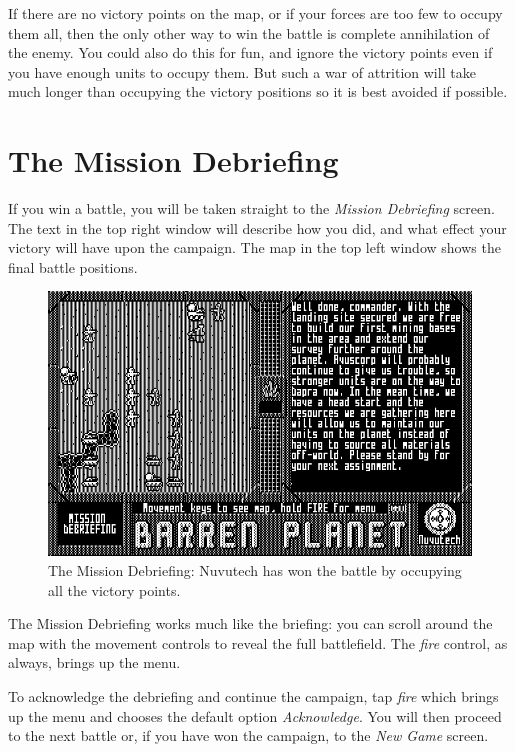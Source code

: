 If there are no victory points on the map, or if your forces are too few to occupy them all, then the only other way to win the battle is complete annihilation of the enemy. You could also do this for fun, and ignore the victory points even if you have enough units to occupy them. But such a war of attrition will take much longer than occupying the victory positions so it is best avoided if possible.

\section{The Mission Debriefing}

\noindent
If you win a battle, you will be taken straight to the {\it Mission Debriefing} screen. The text in the top right window will describe how you did, and what effect your victory will have upon the campaign. The map in the top left window shows the final battle positions.

\begin{figure}[h]
  \includegraphics[width=\textwidth]{mission-debriefing}
  \caption{The Mission Debriefing: Nuvutech has won the battle by
    occupying all the victory points.}
\end{figure}

The Mission Debriefing works much like the briefing: you can scroll around the map with the movement controls to reveal the full battlefield. The {\it fire} control, as always, brings up the menu.

To acknowledge the debriefing and continue the campaign, tap {\it fire} which brings up the menu and chooses the default option {\it Acknowledge}. You will then proceed to the next battle or, if you have won the campaign, to the {\it New Game} screen.

